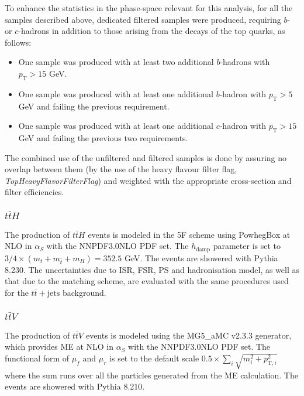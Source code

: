 To enhance the statistics in the phase-space relevant for this analysis, for all the samples described above, dedicated filtered samples were produced, requiring $b$- or $c$-hadrons in addition to those arising from the decays of the top quarks, as follows:

\begin{itemize}
  \item One sample was produced with at least two additional $b$-hadrons with $p_{\text{T}}>15$ GeV.
  \item One sample was produced with at least one additional $b$-hadron with $p_{\text{T}}>5$ GeV and failing the previous requirement.
  \item One sample was produced with at least one additional $c$-hadron with $p_{\text{T}}>15$ GeV and failing the previous two requirements.
\end{itemize}

The combined use of the unfiltered and filtered samples is done by assuring no overlap between them (by the use of the heavy flavour filter flag, \textit{TopHeavyFlavorFilterFlag}) and weighted with the appropriate cross-section and filter efficiencies.


\subsubsection{$t\bar{t}H$}
\label{subsec:TthSamples}

The production of $t\bar{t}H$ events is modeled in the 5F scheme using PowhegBox \cite{Hartanto:2015uka} at NLO in $\alpha_{S}$ with the NNPDF3.0NLO PDF set. The $h_{\text{damp}}$ parameter is set to $3/4\times(m_{t}+m_{\bar{t}}+m_{H})=352.5$ GeV. The events are showered with Pythia 8.230. The uncertainties due to ISR, FSR, PS and hadronisation model, as well as that due to the matching scheme, are evaluated with the same procedures used for the $t\bar{t}+\text{jets}$ background.


\subsubsection{$t\bar{t}V$}
\label{subsec:TtvSamples}

The production of $t\bar{t}V$ events is modeled using the MG5\_aMC v2.3.3 generator, which provides ME at NLO in $\alpha_{S}$ with the NNPDF3.0NLO PDF set. The functional form of $\mu_{f}$ and $\mu_{r}$ is set to the default scale $0.5{\times}{\sum_{i}}\sqrt{m_{i}^{2}+p_{\text{T},i}^{2}}$ where the sum runs over all the particles generated from the ME calculation. The events are showered with Pythia 8.210.

